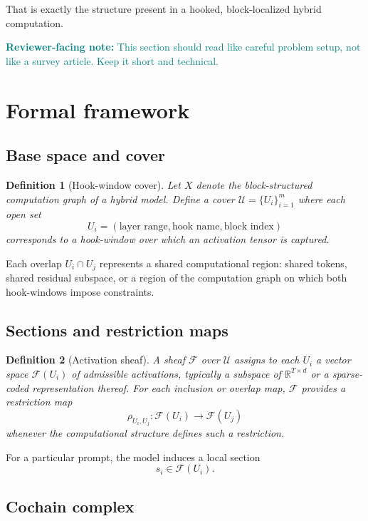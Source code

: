 \documentclass[11pt]{article}
\newtheorem{definition}{Definition}
\newcommand{\reviewer}[1]{\textcolor{teal}{\textbf{Reviewer-facing note:} #1}}
\newcommand{\R}{\mathbb{R}}
\begin{document}
That is exactly the structure present in a hooked, block-localized hybrid computation.

\reviewer{This section should read like careful problem setup, not like a survey article. Keep it short and technical.}

\section{Formal framework}

\subsection{Base space and cover}

\begin{definition}[Hook-window cover]
Let $X$ denote the block-structured computation graph of a hybrid model. Define a cover $\mathcal{U} = \{U_i\}_{i=1}^m$ where each open set
\[
U_i = (\text{layer range}, \text{hook name}, \text{block index})
\]
corresponds to a hook-window over which an activation tensor is captured.
\end{definition}

Each overlap $U_i \cap U_j$ represents a shared computational region: shared tokens, shared residual subspace, or a region of the computation graph on which both hook-windows impose constraints.

\subsection{Sections and restriction maps}

\begin{definition}[Activation sheaf]
A sheaf $\mathcal{F}$ over $\mathcal{U}$ assigns to each $U_i$ a vector space $\mathcal{F}(U_i)$ of admissible activations, typically a subspace of $\R^{T \times d}$ or a sparse-coded representation thereof. For each inclusion or overlap map, $\mathcal{F}$ provides a restriction map
\[
\rho_{U_i,U_j} : \mathcal{F}(U_i) \to \mathcal{F}(U_j)
\]
whenever the computational structure defines such a restriction.
\end{definition}

For a particular prompt, the model induces a local section
\[
s_i \in \mathcal{F}(U_i).
\]

\subsection{Cochain complex}
\end{document}
